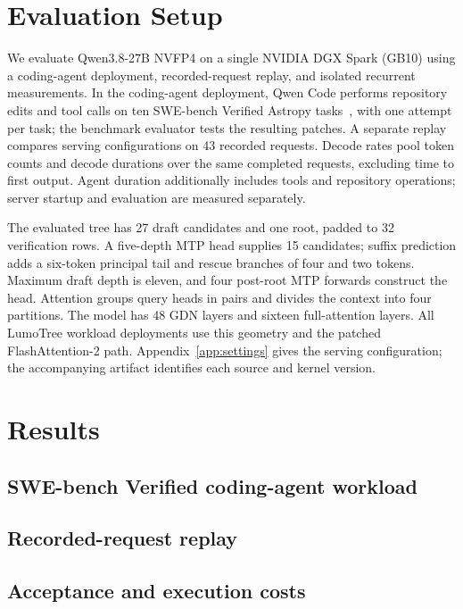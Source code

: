 \documentclass[conference]{IEEEtran}
\newcommand{\sys}{LumoTree}
\begin{document}
\section{Evaluation Setup}
\label{sec:protocol}
We evaluate Qwen3.8-27B NVFP4 on a single NVIDIA DGX Spark (GB10) using a coding-agent deployment, recorded-request replay, and isolated recurrent measurements. In the coding-agent deployment, Qwen Code performs repository edits and tool calls on ten SWE-bench Verified Astropy tasks~\cite{jimenez2024swe}, with one attempt per task; the benchmark evaluator tests the resulting patches. A separate replay compares serving configurations on 43 recorded requests. Decode rates pool token counts and decode durations over the same completed requests, excluding time to first output. Agent duration additionally includes tools and repository operations; server startup and evaluation are measured separately.

The evaluated tree has 27 draft candidates and one root, padded to 32 verification rows. A five-depth MTP head supplies 15 candidates; suffix prediction adds a six-token principal tail and rescue branches of four and two tokens. Maximum draft depth is eleven, and four post-root MTP forwards construct the head. Attention groups query heads in pairs and divides the context into four partitions. The model has 48 GDN layers and sixteen full-attention layers. All \sys{} workload deployments use this geometry and the patched FlashAttention-2 path. Appendix~\ref{app:settings} gives the serving configuration; the accompanying artifact identifies each source and kernel version.



\section{Results}
\label{sec:results}
\subsection{SWE-bench Verified coding-agent workload}
\label{sec:agent-workload}


\subsection{Recorded-request replay}
\label{sec:request-replay}


\subsection{Acceptance and execution costs}

\end{document}
